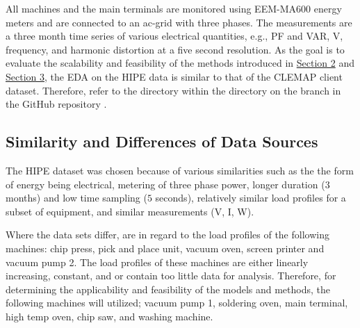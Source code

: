 All machines and the main terminals are monitored using EEM-MA600 energy meters and are connected to an ac-grid with three phases. The measurements are a three month time series of various electrical quantities, e.g., PF and \ac{VAR}, V, frequency, and harmonic distortion at a five second resolution. As the goal is to evaluate the scalability and feasibility of the methods introduced in \hyperlink{section.2}{Section 2} and \hyperlink{section.3}{Section 3}, the EDA on the HIPE data is similar to that of the CLEMAP client dataset. Therefore, refer to the  directory within the  directory on the   branch in the GitHub repository \cite{Stechschulte_Gaussian_Processes_for_2022}. 

\subsection{Similarity and Differences of Data Sources}

The HIPE dataset was chosen because of various similarities such as the the form of energy being electrical, metering of three phase power, longer duration ($3$ months) and low time sampling ($5$ seconds), relatively similar load profiles for a subset of equipment, and similar measurements (V, I, W). 

Where the data sets differ, are in regard to the load profiles of the following machines: chip press, pick and place unit, vacuum oven, screen printer and vacuum pump 2. The load profiles of these machines are either linearly increasing, constant, and or contain too little data for analysis. Therefore, for determining the applicability and feasibility of the models and methods, the following machines will utilized; vacuum pump 1, soldering oven, main terminal, high temp oven, chip saw, and washing machine.
